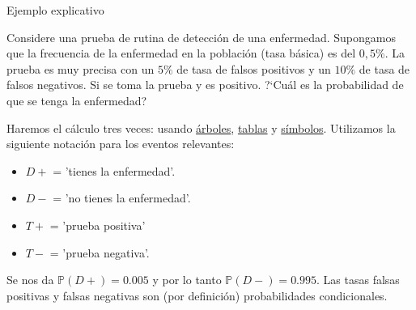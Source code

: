 \documentclass[10pt]{beamer}
\begin{document}
\begin{frame}{Ejemplo explicativo}
\small{Considere una prueba de rutina de detecci\'on de una enfermedad. Supongamos que la frecuencia de la enfermedad en la poblaci\'on (tasa b\'asica) es del $0,5\%$. La prueba es muy precisa con un $5\%$ de tasa de falsos positivos y un $10\%$ de tasa de falsos negativos. Si se  toma la prueba y es  positivo. ?`Cu\'al es la probabilidad de que se tenga la enfermedad?
	
Haremos el c\'alculo tres veces: usando \underline{\'arboles}, \underline{tablas} y \underline{s\'imbolos}. Utilizamos la siguiente notaci\'on para los eventos relevantes:

\begin{itemize}
\item $D+$ = 'tienes la enfermedad'.
\item $D-$ = 'no tienes la enfermedad'.
\item $T+$ = 'prueba positiva'
\item $T-$ = 'prueba negativa'.
\end{itemize}

Se nos da $\mathbb{P}(D +) = 0.005$ y por lo tanto $\mathbb{P}(D-) = 0.995$. Las tasas falsas positivas y falsas negativas son (por definici\'on) probabilidades condicionales.
}
\end{frame}
\end{document}
